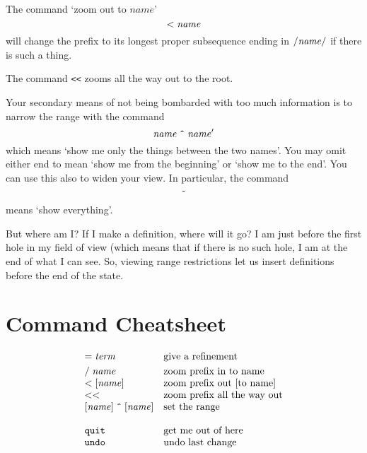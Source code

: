 \documentclass{article}
\newcommand*\cleartoleftpage{%
  \clearpage
  \ifodd\value{page}\hbox{}\newpage\fi
}
\begin{document}
The command `zoom out to $\mathit{name}$'
\[
{\tt <}\;\mathit{name}
\]
will change the prefix to its longest proper subsequence ending in
${\tt /}\mathit{name}{\tt /}$
if there is such a thing.

The command {\tt <<} zooms all the way out to the root.

Your secondary means of not being bombarded with too much information is to narrow
the range with the command
\[
\mathit{name}\;\mbox{\tt \^{}}\;\mathit{name}'
\]
which means `show me only the things between the two names'. You may omit either end
to mean `show me from the beginning' or `show me to the end'. You can use this also to
widen your view. In particular, the command
\[
\mbox{\tt \^{}}
\]
means `show everything'.

But where am I? If I make a definition, where will it go? I am just before
the first hole in my field of view (which means that if there is no such hole, I am at the
end of what I can see. So, viewing range restrictions let us insert definitions
before the end of the state.



\cleartoleftpage
\appendix

\section{Command Cheatsheet}

\[\begin{array}{ll}
{\tt =}\;\mathit{term} & \mbox{give a refinement} \smallskip\\

{\tt /}\;\mathit{name} & \mbox{zoom prefix in to name}\\
{\tt <}\;[\mathit{name}] & \mbox{zoom prefix out [to name]}\\
{\tt <<} & \mbox{zoom prefix all the way out}\\
{}[\mathit{name}]\;\mbox{\tt \^{}}\;[\mathit{name}] & \mbox{set the
                                                      range}
\bigskip\\
{\tt quit} & \mbox{get me out of here} \\
{\tt undo} & \mbox{undo last change}
\end{array}\]
\end{document}
